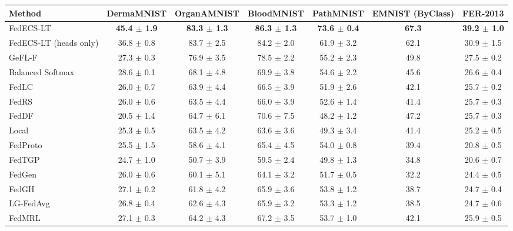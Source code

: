 \begin{tabular}{lcccccc}
\toprule
Method & DermaMNIST & OrganAMNIST & BloodMNIST & PathMNIST & EMNIST (ByClass) & FER-2013\\
\midrule
FedECS-LT & \textbf{45.4 $\pm$ 1.9} & \textbf{83.3 $\pm$ 1.3} & \textbf{86.3 $\pm$ 1.3} & \textbf{73.6 $\pm$ 0.4} & \textbf{67.3} & \textbf{39.2 $\pm$ 1.0}\\
FedECS-LT (heads only) & 36.8 $\pm$ 0.8 & 83.7 $\pm$ 2.5 & 84.2 $\pm$ 2.0 & 61.9 $\pm$ 3.2 & 62.1 & 30.9 $\pm$ 1.5\\
GeFL-F & 27.3 $\pm$ 0.3 & 76.9 $\pm$ 3.5 & 78.5 $\pm$ 2.2 & 55.2 $\pm$ 2.3 & 49.8 & 27.5 $\pm$ 0.2\\
Balanced Softmax & 28.6 $\pm$ 0.1 & 68.1 $\pm$ 4.8 & 69.9 $\pm$ 3.8 & 54.6 $\pm$ 2.2 & 45.6 & 26.6 $\pm$ 0.4\\
FedLC & 26.0 $\pm$ 0.7 & 63.9 $\pm$ 4.4 & 66.5 $\pm$ 3.9 & 51.9 $\pm$ 2.6 & 42.1 & 25.7 $\pm$ 0.2\\
FedRS & 26.0 $\pm$ 0.6 & 63.5 $\pm$ 4.4 & 66.0 $\pm$ 3.9 & 52.6 $\pm$ 1.4 & 41.4 & 25.7 $\pm$ 0.3\\
FedDF & 20.5 $\pm$ 1.4 & 64.7 $\pm$ 6.1 & 70.6 $\pm$ 7.5 & 48.2 $\pm$ 1.2 & 47.2 & 25.7 $\pm$ 0.3\\
Local & 25.3 $\pm$ 0.5 & 63.5 $\pm$ 4.2 & 63.6 $\pm$ 3.6 & 49.3 $\pm$ 3.4 & 41.4 & 25.2 $\pm$ 0.5\\
FedProto & 25.5 $\pm$ 1.5 & 58.6 $\pm$ 4.1 & 65.4 $\pm$ 4.5 & 54.0 $\pm$ 0.8 & 39.4 & 20.8 $\pm$ 0.5\\
FedTGP & 24.7 $\pm$ 1.0 & 50.7 $\pm$ 3.9 & 59.5 $\pm$ 2.4 & 49.8 $\pm$ 1.3 & 34.8 & 20.6 $\pm$ 0.7\\
FedGen & 26.0 $\pm$ 0.6 & 60.1 $\pm$ 5.1 & 64.1 $\pm$ 3.2 & 51.7 $\pm$ 0.5 & 32.2 & 24.4 $\pm$ 0.5\\
FedGH & 27.1 $\pm$ 0.2 & 61.8 $\pm$ 4.2 & 65.9 $\pm$ 3.6 & 53.8 $\pm$ 1.2 & 38.7 & 24.7 $\pm$ 0.4\\
LG-FedAvg & 26.8 $\pm$ 0.4 & 62.6 $\pm$ 4.3 & 65.9 $\pm$ 3.2 & 53.3 $\pm$ 1.2 & 38.5 & 24.7 $\pm$ 0.6\\
FedMRL & 27.1 $\pm$ 0.3 & 64.2 $\pm$ 4.3 & 67.2 $\pm$ 3.5 & 53.7 $\pm$ 1.0 & 42.1 & 25.9 $\pm$ 0.5\\
\bottomrule
\end{tabular}
